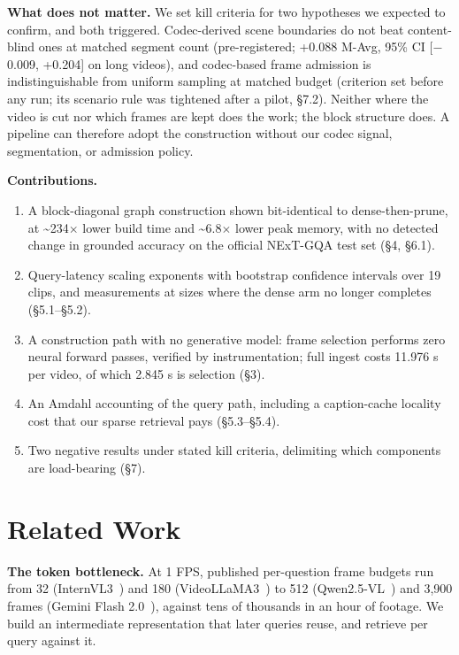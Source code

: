 \documentclass[sigconf,review,anonymous]{acmart}
\providecommand{\tightlist}{\setlength{\itemsep}{0pt}\setlength{\parskip}{0pt}}
\begin{document}
\textbf{What does not matter.} We set kill criteria for two hypotheses we expected to confirm,
and both triggered. Codec-derived scene boundaries do not beat content-blind ones at matched
segment count (pre-registered; +0.088 M-Avg, 95\% CI {[}\ensuremath{-}0.009, +0.204{]} on long videos), and
codec-based frame admission is indistinguishable from uniform sampling at matched budget
(criterion set before any run; its scenario rule was tightened after a pilot, §7.2). Neither where the
video is cut nor which frames are kept does the work; the block structure does. A pipeline
can therefore adopt the construction without our codec signal, segmentation, or admission
policy.

\textbf{Contributions.}

\begin{enumerate}
\def\labelenumi{\arabic{enumi}.}
\tightlist
\item
  A block-diagonal graph construction shown bit-identical to dense-then-prune, at \textasciitilde234\ensuremath{\times}
  lower build time and \textasciitilde6.8\ensuremath{\times} lower peak memory, with no detected change in grounded accuracy
  on the official NExT-GQA test set (§4, §6.1).
\item
  Query-latency scaling exponents with bootstrap confidence intervals over 19 clips, and
  measurements at sizes where the dense arm no longer completes (§5.1--§5.2).
\item
  A construction path with no generative model: frame selection performs zero neural
  forward passes, verified by instrumentation; full ingest costs 11.976 s per
  video, of which 2.845 s is selection (§3).
\item
  An Amdahl accounting of the query path, including a caption-cache locality cost that our
  sparse retrieval pays (§5.3--§5.4).
\item
  Two negative results under stated kill criteria, delimiting which components are
  load-bearing (§7).
\end{enumerate}

\section{Related Work}

\textbf{The token bottleneck.} At 1 FPS, published per-question frame budgets run from 32
(InternVL3~\cite{zhu2025internvl3}) and 180 (VideoLLaMA3~\cite{zhang2025videollama3}) to 512 (Qwen2.5-VL~\cite{bai2025qwen25vl}) and 3,900 frames (Gemini Flash
2.0~\cite{google2025gemini2flash}), against tens of thousands in an hour of footage. We build an intermediate
representation that later queries reuse, and retrieve per query against it.
\end{document}

